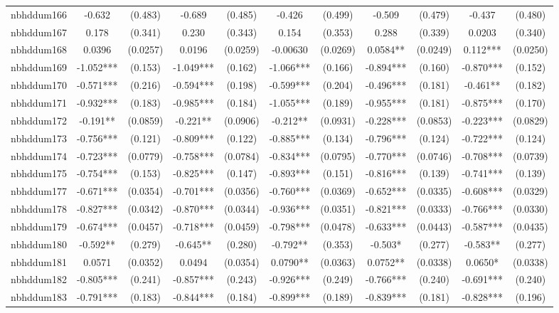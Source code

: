 \documentclass[]{article}
\begin{document}
\begin{tabular}{lcccccccccc}
nbhddum166 & -0.632 & (0.483) & -0.689 & (0.485) & -0.426 & (0.499) & -0.509 & (0.479) & -0.437 & (0.480) \\
nbhddum167 & 0.178 & (0.341) & 0.230 & (0.343) & 0.154 & (0.353) & 0.288 & (0.339) & 0.0203 & (0.340) \\
nbhddum168 & 0.0396 & (0.0257) & 0.0196 & (0.0259) & -0.00630 & (0.0269) & 0.0584** & (0.0249) & 0.112*** & (0.0250) \\
nbhddum169 & -1.052*** & (0.153) & -1.049*** & (0.162) & -1.066*** & (0.166) & -0.894*** & (0.160) & -0.870*** & (0.152) \\
nbhddum170 & -0.571*** & (0.216) & -0.594*** & (0.198) & -0.599*** & (0.204) & -0.496*** & (0.181) & -0.461** & (0.182) \\
nbhddum171 & -0.932*** & (0.183) & -0.985*** & (0.184) & -1.055*** & (0.189) & -0.955*** & (0.181) & -0.875*** & (0.170) \\
nbhddum172 & -0.191** & (0.0859) & -0.221** & (0.0906) & -0.212** & (0.0931) & -0.228*** & (0.0853) & -0.223*** & (0.0829) \\
nbhddum173 & -0.756*** & (0.121) & -0.809*** & (0.122) & -0.885*** & (0.134) & -0.796*** & (0.124) & -0.722*** & (0.124) \\
nbhddum174 & -0.723*** & (0.0779) & -0.758*** & (0.0784) & -0.834*** & (0.0795) & -0.770*** & (0.0746) & -0.708*** & (0.0739) \\
nbhddum175 & -0.754*** & (0.153) & -0.825*** & (0.147) & -0.893*** & (0.151) & -0.816*** & (0.139) & -0.741*** & (0.139) \\
nbhddum177 & -0.671*** & (0.0354) & -0.701*** & (0.0356) & -0.760*** & (0.0369) & -0.652*** & (0.0335) & -0.608*** & (0.0329) \\
nbhddum178 & -0.827*** & (0.0342) & -0.870*** & (0.0344) & -0.936*** & (0.0351) & -0.821*** & (0.0333) & -0.766*** & (0.0330) \\
nbhddum179 & -0.674*** & (0.0457) & -0.718*** & (0.0459) & -0.798*** & (0.0478) & -0.633*** & (0.0443) & -0.587*** & (0.0435) \\
nbhddum180 & -0.592** & (0.279) & -0.645** & (0.280) & -0.792** & (0.353) & -0.503* & (0.277) & -0.583** & (0.277) \\
nbhddum181 & 0.0571 & (0.0352) & 0.0494 & (0.0354) & 0.0790** & (0.0363) & 0.0752** & (0.0338) & 0.0650* & (0.0338) \\
nbhddum182 & -0.805*** & (0.241) & -0.857*** & (0.243) & -0.926*** & (0.249) & -0.766*** & (0.240) & -0.691*** & (0.240) \\
nbhddum183 & -0.791*** & (0.183) & -0.844*** & (0.184) & -0.899*** & (0.189) & -0.839*** & (0.181) & -0.828*** & (0.196) \\

\end{tabular}
\end{document}
